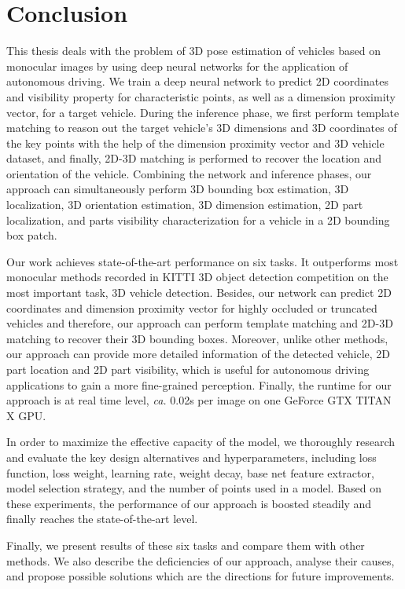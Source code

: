 \documentclass[a4paper,12pt]{article}
\begin{document}
\clearpage

\section{Conclusion}
 This thesis deals with the problem of 3D pose estimation of vehicles based on monocular images by using deep neural networks for the application of autonomous driving. We train a deep neural network to predict 2D coordinates and visibility property for characteristic points, as well as a dimension proximity vector, for a target vehicle. During the inference phase, we first perform template matching to reason out the target vehicle's 3D dimensions and 3D coordinates of the key points with the help of the dimension proximity vector and 3D vehicle dataset, and finally, 2D-3D matching is performed to recover the location and orientation of the vehicle. Combining the network and inference phases, our approach can simultaneously perform 3D bounding box estimation, 3D localization, 3D orientation estimation, 3D dimension estimation, 2D part localization, and parts visibility characterization for a vehicle in a 2D bounding box patch. 
 
Our work achieves state-of-the-art performance on six tasks. It outperforms most monocular methods recorded in KITTI 3D object detection competition on the most important task, 3D vehicle detection. Besides, our network can predict 2D coordinates and dimension proximity vector for highly occluded or truncated vehicles and therefore, our approach can perform template matching and 2D-3D matching to recover their 3D bounding boxes. Moreover, unlike other methods, our approach can provide more detailed information of the detected vehicle, \eg 2D part location and 2D part visibility, which is useful for autonomous driving applications to gain a more  fine-grained perception. Finally, the runtime for our approach is at real time level, \textit{ca.} 0.02s per image on one GeForce GTX TITAN X GPU. 

In order to maximize the effective capacity of the model, we thoroughly research and evaluate the key design alternatives and hyperparameters, including loss function, loss weight, learning rate, weight decay, base net feature extractor, model selection strategy, and the number of points used in a model. Based on these experiments, the performance of our approach is boosted steadily and finally reaches the state-of-the-art level.

Finally, we present results of these six tasks and compare them with other methods. We also describe the deficiencies of our approach, analyse their causes, and propose possible solutions which are the directions for future improvements. 
\clearpage
\end{document}

